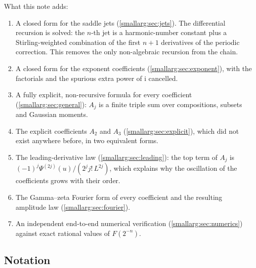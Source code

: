 \documentclass[11pt,oneside]{article}
\theoremstyle{definition}
\theoremstyle{remark}
\newcommand{\ii}{\mathrm i}
\begin{document}
What this note adds:

\begin{enumerate}
\item A closed form for the saddle jets (\cref{smallarg:sec:jets}).  The differential
  recursion is solved: the $n$-th jet is a harmonic-number constant plus a
  Stirling-weighted combination of the first $n+1$ derivatives of the periodic
  correction.  This removes the only non-algebraic recursion from the chain.
\item A closed form for the exponent coefficients (\cref{smallarg:sec:exponent}), with
  the factorials and the spurious extra power of $\ii$ cancelled.
\item A fully explicit, non-recursive formula for every coefficient
  (\cref{smallarg:sec:general}): $A_j$ is a finite triple sum over compositions, subsets
  and Gaussian moments.
\item The explicit coefficients $A_2$ and $A_3$ (\cref{smallarg:sec:explicit}), which did
  not exist anywhere before, in two equivalent forms.
\item The leading-derivative law (\cref{smallarg:sec:leading}): the top term of $A_j$ is
  $(-1)^j\Psi^{(2j)}(u)/(2^jj!\,L^{2j})$, which explains why the oscillation of
  the coefficients grows with their order.
\item The Gamma--zeta Fourier form of every coefficient and the resulting
  amplitude law (\cref{smallarg:sec:fourier}).
\item An independent end-to-end numerical verification (\cref{smallarg:sec:numerics})
  against exact rational values of $F(2^{-n})$.
\end{enumerate}

\subsection{Notation}
\end{document}
